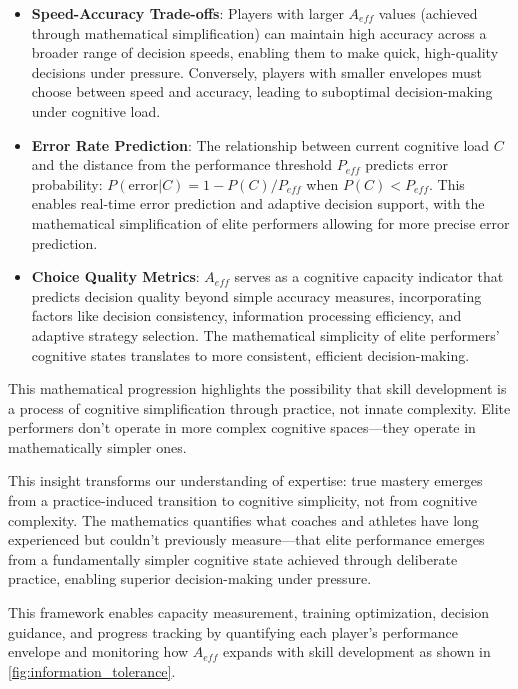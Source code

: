 \documentclass{article}
\begin{document}
\begin{itemize}
    \item \textbf{Speed-Accuracy Trade-offs}: Players with larger $A_{eff}$ values (achieved through mathematical 
    simplification) can maintain high accuracy across a broader range of decision speeds, enabling them to make 
    quick, high-quality decisions under pressure. Conversely, players with smaller envelopes must choose between 
    speed and accuracy, leading to suboptimal decision-making under cognitive load.
    
    \item \textbf{Error Rate Prediction}: The relationship between current cognitive load $C$ and the distance 
    from the performance threshold $P_{eff}$ predicts error probability: $P(\text{error}|C) = 1 - P(C)/P_{eff}$ 
    when $P(C) < P_{eff}$. This enables real-time error prediction and adaptive decision support, with the 
    mathematical simplification of elite performers allowing for more precise error prediction.
    
    \item \textbf{Choice Quality Metrics}: $A_{eff}$ serves as a cognitive capacity indicator that predicts 
    decision quality beyond simple accuracy measures, incorporating factors like decision consistency, 
    information processing efficiency, and adaptive strategy selection. The mathematical simplicity of elite 
    performers' cognitive states translates to more consistent, efficient decision-making.
\end{itemize}

This mathematical progression highlights the possibility that skill development is a process of cognitive simplification
through practice, not innate complexity. Elite performers don't operate in more complex cognitive spaces—they operate in
mathematically simpler ones. 

This insight transforms our understanding of expertise: true mastery emerges from a practice-induced transition to 
cognitive simplicity, not from cognitive complexity. The mathematics quantifies what coaches and athletes have 
long experienced but couldn't previously measure—that elite performance emerges from a fundamentally simpler cognitive 
state achieved through deliberate practice, enabling superior decision-making under pressure.

This framework enables capacity measurement, training optimization, decision guidance, and progress tracking by
quantifying each player's performance envelope and monitoring how $A_{eff}$ expands with skill development as shown in
\cref{fig:information_tolerance}.
\end{document}
